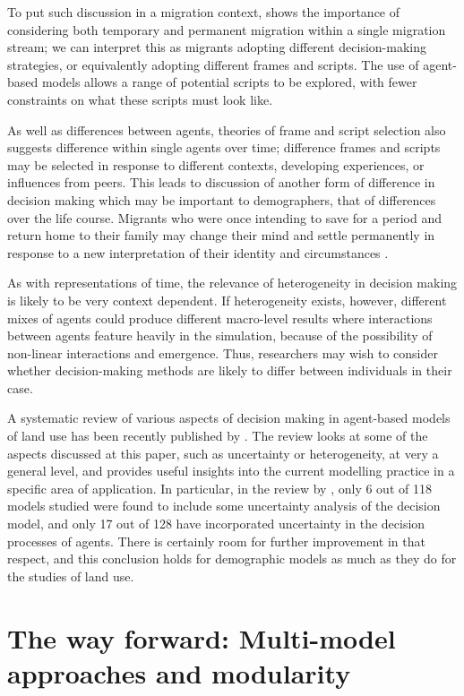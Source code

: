 \documentclass{article}
\begin{document}
To put such discussion in a migration context, \cite{Bijwaard2008} shows the importance of considering both temporary and permanent migration within a single migration stream; we can interpret this as migrants adopting different decision-making strategies, or equivalently adopting different frames and scripts. The use of agent-based models allows a range of potential scripts to be explored, with fewer constraints on what these scripts must look like. 

As well as differences between agents, theories of frame and script selection also suggests difference within single agents over time; difference frames and scripts may be selected in response to different contexts, developing experiences, or influences from peers. This leads to discussion of another form of difference in decision making which may be important to demographers, that of differences over the life course. Migrants who were once intending to save for a period and return home to their family may change their mind and settle permanently in response to a new interpretation of their identity and circumstances \citep{Constant2002}.

As with representations of time, the relevance of heterogeneity in decision making is likely to be very context dependent. If heterogeneity exists, however, different mixes of agents could produce different macro-level results where interactions between agents feature heavily in the simulation, because of the possibility of non-linear interactions and emergence. Thus, researchers may wish to consider whether decision-making methods are likely to differ between individuals in their case.

A systematic review of various aspects of decision making in agent-based models of land use has been recently published by \citet{Groeneveld}. The review looks at some of the aspects discussed at this paper, such as uncertainty or heterogeneity, at very a general level, and provides useful insights into the current modelling practice in a specific area of application. In particular, in the review by \citet{Groeneveld}, only 6 out of 118 models studied were found to include some uncertainty analysis of the decision model, and only 17 out of 128 have incorporated uncertainty in the decision processes of agents. There is certainly room for further improvement in that respect, and this conclusion holds for demographic models as much as they do for the studies of land use.

\section{The way forward: Multi-model approaches and
modularity}\label{multi-model-approaches-and-modularity}
\end{document}
